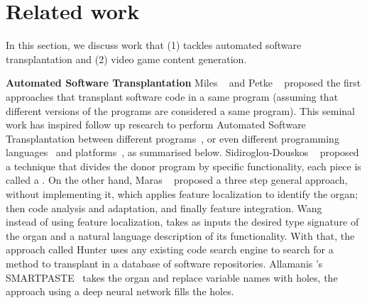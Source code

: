 \section{Related work} 
\label{sec:Related}
In this section, we discuss work that (1) tackles automated software transplantation and (2) video game content generation.

\noindent \textbf{Automated Software Transplantation}
Miles \etal~\cite{miles2012situ} and Petke \etal~\cite{petke2014using} proposed the first approaches that transplant software code in a same program (assuming that different versions of the programs are considered a same program). 
This seminal work has inspired follow up research to perform Automated Software Transplantation between different programs~\cite{barr2015automated}, or even different programming languages~\cite{marginean2021automated}  and platforms~\cite{kwon2017cpr}, as summarised below.
Sidiroglou-Douskos \etal~\cite{sidiroglou2015horizontal} proposed a technique that divides the donor program by specific functionality, each piece is called a . 
On the other hand, Maras \etal~\cite{maras2015towards} proposed a three step general approach, without implementing it, which applies feature localization to identify the organ; then code analysis and adaptation, and finally feature integration. Wang \etal~\cite{wang2016hunter} instead of using feature localization, takes as inputs the desired type signature of the organ and a natural language description of its functionality. With that, the approach called Hunter uses any existing code search engine to search for a method to transplant in a database of software repositories. 
Allamanis \etal's SMARTPASTE~\cite{allamanis2017smartpaste} takes the organ and replace variable names with holes, the approach using a deep neural network fills the holes. 

